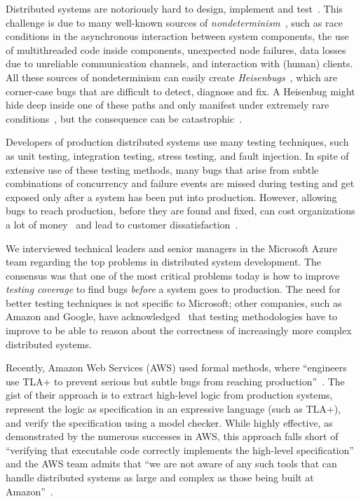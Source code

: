 Distributed systems are notoriously hard to design, implement and test~\cite{cavage2013there, laguna2015debugging, maddox2015test}.
This challenge is due to many well-known sources of \emph{nondeterminism}~\cite{chandra2007paxos}, such as race conditions in the asynchronous interaction between system components, the use of multithreaded code inside components, unexpected node failures, data losses due to unreliable communication channels, and interaction with (human) clients.
All these sources of nondeterminism can easily create \emph{Heisenbugs}~\cite{gray1986computers, musuvathi2008finding}, which are corner-case bugs that are difficult to detect, diagnose and fix. 
A Heisenbug might hide deep inside one of these paths and only manifest under extremely rare conditions~\cite{gray1986computers, musuvathi2008finding}, but the consequence can be catastrophic~\cite{amazon2012aws, google2014outage}.

Developers of production distributed systems use many testing techniques,
such as unit testing, integration testing, stress testing, and fault injection.
In spite of extensive use of these testing methods,
many bugs that arise from subtle combinations of concurrency and failure events
are missed during testing and get exposed only after a system has been put into production.
However, allowing bugs to reach production, before they are found and fixed, can cost organizations a lot of money~\cite{tassey2002economic} and lead to customer dissatisfaction~\cite{amazon2012aws, google2014outage}.

We interviewed technical leaders and senior managers in the Microsoft Azure team regarding the top problems in distributed system development.
The consensus was that one of the most critical problems today is how to improve \emph{testing coverage} to find bugs \emph{before} a system goes to production.
The need for better testing techniques is not specific to Microsoft;
other companies, such as Amazon and Google, have acknowledged~\cite{chandra2007paxos,newcombe2015aws} that testing methodologies have to improve to be able to reason about the correctness of increasingly more complex distributed systems.

Recently, Amazon Web Services (AWS) used formal methods, where ``engineers use TLA+ to prevent serious but subtle bugs from reaching production''~\cite{newcombe2015aws}. The gist of their approach is to extract high-level logic from production systems, represent the logic as specification in an expressive language (such as TLA+), and verify the specification using a model checker. While highly effective, as demonstrated by the numerous successes in AWS, this approach falls short of ``verifying that executable code correctly implements the high-level specification'' and the AWS team admits that ``we are not aware of any such tools that can handle distributed systems as large and complex as those being built at Amazon''~\cite{newcombe2015aws}.

